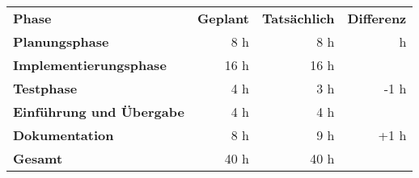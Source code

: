 \begin{tabular}{lrrr}
\rowcolor{heading}\textbf{Phase} & \textbf{Geplant} & \textbf{Tatsächlich} & \textbf{Differenz} \\
\textbf{Planungsphase} & 8 h & 8 h  &  h \\
\rowcolor{odd}\textbf{Implementierungsphase} & 16 h   & 16 h  & \\
\textbf{Testphase} & 4 h  & 3 h  & -1 h \\
\rowcolor{odd}\textbf{Einführung und Übergabe} & 4 h   & 4 h   &  \\
\textbf{Dokumentation} & 8 h   &  9 h  & +1 h \\
\hline
\hline
\rowcolor{odd}\textbf{Gesamt} & 40 h  & 40 h  &  \\
\end{tabular}
